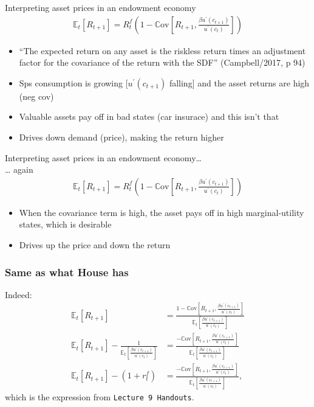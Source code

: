 \documentclass[presentation]{beamer}
\begin{document}
\begin{frame}[label=sec-4-5]{Interpreting asset prices in an endowment economy}
\begin{align*}
\mathbb{E}_{t} \left[ R_{t+1} \right] = R^{f}_{t} \left( 1 - \mathbb{C} \text{ov} \left[ R_{t+1}, \frac{\beta u^{\prime}(c_{t+1})}{u^{\prime}(c_{t})} \right] \right)
\end{align*}

\begin{itemize}
\item ``The expected return on any asset is the riskless return times an adjustment factor for the covariance of the return with the SDF'' (Campbell/2017, p 94)
\item Sps consumption is growing [$u^{\prime}(c_{t+1})$ falling] and the asset returns are high (neg cov)
\item Valuable assets pay off in bad states (car insurace) and this isn't that
\item Drives down demand (price), making the return higher
\end{itemize}
\end{frame}

\begin{frame}[label=sec-4-6]{Interpreting asset prices in an endowment economy\dots{} \\ \dots{} again}
\begin{align*}
\mathbb{E}_{t} \left[ R_{t+1} \right] = R^{f}_{t} \left( 1 - \mathbb{C} \text{ov} \left[ R_{t+1}, \frac{\beta u^{\prime}(c_{t+1})}{u^{\prime}(c_{t})} \right] \right)
\end{align*}

\begin{itemize}
\item When the covariance term is high, the asset pays off in high marginal-utility states, which is desirable
\item Drives up the price and down the return
\end{itemize}
\end{frame}

\begin{frame}
\frametitle{Same as what House has}
Indeed:
\begin{align*}
\mathbb{E}_{t} \left[ R_{t+1} \right] &=
\frac{1 - \mathbb{C} \text{ov} \left[ R_{t+1}, \frac{\beta u^{\prime}(c_{t+1})}{u^{\prime}(c_{t})} \right]}{
  \mathbb{E}_{t} \left[ \frac{\beta u^{\prime}(c_{t+1})}{u^{\prime}(c_{t})} \right]} \\
\mathbb{E}_{t} \left[ R_{t+1} \right] - \frac{1}{\mathbb{E}_{t} \left[ \frac{\beta u^{\prime}(c_{t+1})}{u^{\prime}(c_{t})} \right]} &=
\frac{- \mathbb{C} \text{ov} \left[ R_{t+1}, \frac{\beta u^{\prime}(c_{t+1})}{u^{\prime}(c_{t})} \right]}{
  \mathbb{E}_{t} \left[ \frac{\beta u^{\prime}(c_{t+1})}{u^{\prime}(c_{t})} \right]} \\
\mathbb{E}_{t} \left[ R_{t+1} \right] - (1+r_{t}^{f}) &= \frac{- \mathbb{C} \text{ov} \left[ R_{t+1}, \frac{\beta u^{\prime}(c_{t+1})}{u^{\prime}(c_{t})} \right]}{
  \mathbb{E}_{t} \left[ \frac{\beta u^{\prime}(c_{t+1})}{u^{\prime}(c_{t})} \right]},
\end{align*}
which is the expression from \texttt{Lecture 9 Handouts}.
\end{frame}
\end{document}
